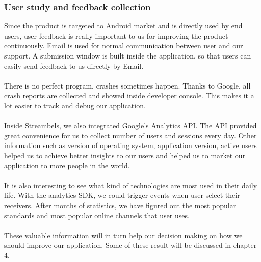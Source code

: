 \subsubsection{User study and feedback collection}
Since the product is targeted to Android market and is directly used by end users, user feedback is really important to us for improving the product continuously. Email is used for normal communication between user and our support. A submission window is built inside the application, so that users can easily send feedback to us directly by Email.\\
\\
There is no perfect program, crashes sometimes happen. Thanks to Google, all crash reports are collected and showed inside developer console. This makes it a lot easier to track and debug our application.\\
\\
Inside Streambels, we also integrated Google's Analytics API. The API provided great convenience for us to collect number of users and sessions every day. Other information such as version of operating system, application version, active users helped us to achieve better insights to our users and helped us to market our application to more
people in the world.\\
\\
It is also interesting to see what kind of technologies are most used in their daily life. With the analytics SDK, we could trigger events when user select their receivers. After months of statistics, we have figured out the most popular standards and most popular online channels that user uses.\\
\\
These valuable information will in turn help our decision making on how we should improve our application. Some of these result will be discussed in chapter 4.